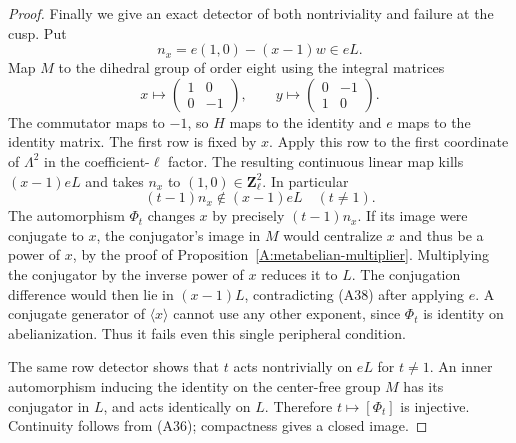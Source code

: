 \documentclass[11pt,oneside]{article}
\begin{document}
\begin{proof}
Finally we give an exact detector of both nontriviality
and failure at the cusp. Put
\[
                    n_x=e(1,0)-(x-1)w\in eL.
\]
Map $M$ to the dihedral group of order eight using
the integral matrices
\[
 x\longmapsto\begin{pmatrix}1&0\\0&-1\end{pmatrix},
 \qquad
 y\longmapsto\begin{pmatrix}0&-1\\1&0\end{pmatrix}.
\]
The commutator maps to $-1$, so $H$ maps to the
identity and $e$ maps to the identity matrix.
The first row is fixed by $x$. Apply this row to
the first coordinate of $\Lambda^2$ in the
coefficient-$\ell$ factor. The resulting continuous
linear map kills $(x-1)eL$ and takes $n_x$ to
$(1,0)\in\mathbf Z_\ell^2$. In particular
\[
          (t-1)n_x\notin(x-1)eL\quad(t\ne1).               \tag{A38}
\]
The automorphism $\Phi_t$ changes $x$ by precisely
$(t-1)n_x$. If its image were conjugate to $x$, the
conjugator's image in $M$ would centralize $x$ and
thus be a power of $x$, by the proof of
Proposition~\ref{A:metabelian-multiplier}. Multiplying
the conjugator by the inverse power of $x$ reduces
it to $L$. The conjugation difference would then
lie in $(x-1)L$, contradicting (A38) after applying
$e$. A conjugate generator of $\langle x\rangle$
cannot use any other exponent, since $\Phi_t$ is
identity on abelianization. Thus it fails even this
single peripheral condition.

The same row detector shows that $t$ acts nontrivially
on $eL$ for $t\ne1$. An inner automorphism inducing
the identity on the center-free group $M$ has its
conjugator in $L$, and acts identically on $L$.
Therefore $t\mapsto[\Phi_t]$ is injective.
Continuity follows from (A36); compactness gives
a closed image.
\end{proof}
\end{document}
